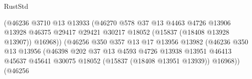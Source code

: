 \begin{lexlean}{RustStd}
\begin{coremodule}
                                              (@46236
                                                @3710
                                                @13
                                                @13933
                                                (@46270
                                                  @578
                                                  @37
                                                  @13
                                                  @4463
                                                  @4726
                                                  @13906
                                                  @13928
                                                  @46375
                                                  @29417
                                                  @29421
                                                  @30217
                                                  @18052
                                                  (@15837 (@18408 @13928 @13907))
                                                  @16968))
                                              (@46256
                                                @350
                                                @357
                                                @13
                                                @17
                                                @13956
                                                @13982
                                                (@46236
                                                  @350
                                                  @13
                                                  @13956
                                                  (@46398
                                                    @202
                                                    @37
                                                    @13
                                                    @4593
                                                    @4726
                                                    @13938
                                                    @13951
                                                    @46413
                                                    @45637
                                                    @45641
                                                    @30075
                                                    @18052
                                                    (@15837 (@18408 @13951 @13939))
                                                    @16968))
                                                (@46256

\end{coremodule}
\end{lexlean}
